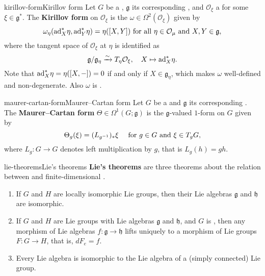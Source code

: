 \begin{topic}{kirillov-form}{Kirillov form}
    Let $G$ be a , $\mathfrak{g}$ its corresponding , and $\mathcal{O}_\xi$ a  for some $\xi \in \mathfrak{g}^*$. The \textbf{Kirillov form} on $\mathcal{O}_\xi$ is the  $\omega \in \Omega^2(\mathcal{O}_\xi)$ given by
    \[ \omega_\eta(\textup{ad}_X^* \eta, \textup{ad}_Y^* \eta) = \eta([X, Y]) \textup{ for all } \eta \in \mathcal{O}_\mu \textup{ and } X, Y \in \mathfrak{g} , \]
    where the tangent space of $\mathcal{O}_\xi$ at $\eta$ is identified as
    \[ \mathfrak{g}/\mathfrak{g}_\eta \xrightarrow{\sim} T_\eta \mathcal{O}_\xi, \quad X \mapsto \textup{ad}_X^* \eta . \]
    Note that $\textup{ad}_X^* \eta = \eta([X, -]) = 0$ if and only if $X \in \mathfrak{g}_\eta$, which makes $\omega$ well-defined and non-degenerate. Also $\omega$ is .
\end{topic}

\begin{topic}{maurer-cartan-form}{Maurer--Cartan form}
    Let $G$ be a  and $\mathfrak{g}$ its corresponding . The \textbf{Maurer--Cartan form} $\Theta \in \Omega^1(G; \mathfrak{g})$ is the $\mathfrak{g}$-valued $1$-form on $G$ given by
    \[ \Theta_g(\xi) = (L_{g^{-1}})_* \xi \quad \textup{ for } g \in G \textup{ and } \xi \in T_g G, \]
    where $L_g \colon G \to G$ denotes left multiplication by $g$, that is $L_g(h) = gh$.
\end{topic}

\begin{topic}{lie-theorems}{Lie's theorems}
    \textbf{Lie's theorems} are three theorems about the relation between  and finite-dimensional .
    \begin{enumerate}[label=(\roman*)]
        \item If $G$ and $H$ are locally isomorphic Lie groups, then their Lie algebras $\mathfrak{g}$ and $\mathfrak{h}$ are isomorphic.
        \item If $G$ and $H$ are Lie groups with Lie algebras $\mathfrak{g}$ and $\mathfrak{h}$, and $G$ is , then any morphism of Lie algebras $f \colon \mathfrak{g} \to \mathfrak{h}$ lifts uniquely to a morphism of Lie groups $F \colon G \to H$, that is, $dF_e = f$.
        \item Every Lie algebra is isomorphic to the Lie algebra of a (simply connected) Lie group.
    \end{enumerate}
\end{topic}

